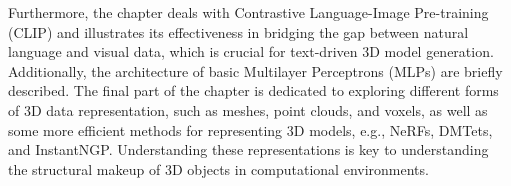 Furthermore, the chapter deals with Contrastive Language-Image Pre-training (CLIP) \citep{radfordCLIP} and illustrates its effectiveness in bridging the gap between natural language and visual data, which is crucial for text-driven 3D model generation. Additionally, the architecture of basic Multilayer Perceptrons (MLPs) are briefly described. The final part of the chapter is dedicated to exploring different forms of 3D data representation, such as meshes, point clouds, and voxels, as well as some more efficient methods for representing 3D models, e.g., NeRFs, DMTets, and InstantNGP\@. Understanding these representations is key to understanding the structural makeup of 3D objects in computational environments.








